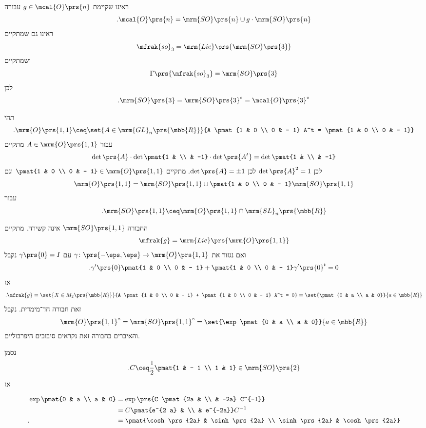 \documentclass[10pt, twoside]{book}
\begin{document}
\begin{example}
ראינו שקיימת
$g \in \mcal{O}\prs{n}$
עבורה
\[\text{.} \mcal{O}\prs{n} = \mrm{SO}\prs{n} \cup g \cdot \mrm{SO}\prs{n}\]
ראינו גם שמתקיים
\[\mfrak{so}_3 = \mrm{Lie}\prs{\mrm{SO}\prs{3}}\]
ושמתקיים
\[\Gamma\prs{\mfrak{so}_3} = \mrm{SO}\prs{3}\]
לכן
\[\text{.} \mrm{SO}\prs{3} = \mrm{SO}\prs{3}^\circ = \mcal{O}\prs{3}^\circ\]
\end{example}

\begin{example}
תהי
\[\text{.} \mrm{O}\prs{1,1} \ceq \set{A \in \mrm{GL}_n\prs{\mbb{R}}}{A \pmat{1 & 0 \\ 0 & - 1} A^t = \pmat{1 & 0 \\ 0 & - 1}}\]
עבור
$A \in \mrm{O}\prs{1,1}$
מתקיים
\[\det\prs{A} \cdot \det \pmat{1 & \\ & -1} \cdot \det\prs{A^t} = \det\pmat{1 & \\ & -1}\]
לכן
$\det\prs{A}^2 = 1$
לכן
$\det\prs{A} = \pm 1$.
מתקיים
$\pmat{1 & 0 \\ 0 & - 1} \in \mrm{O}\prs{1,1}$
וגם
\[\mrm{O}\prs{1,1} = \mrm{SO}\prs{1,1} \cup \pmat{1 & 0 \\ 0 & - 1} \mrm{SO}\prs{1,1}\]
עבור
\[\text{.} \mrm{SO}\prs{1,1} \ceq \mrm{O}\prs{1,1} \cap \mrm{SL}_n\prs{\mbb{R}}\]

החבורה
$\mrm{SO}\prs{1,1}$
אינה קשירה.
מתקיים
\[\mfrak{g} = \mrm{Lie}\prs{\mrm{O}\prs{1,1}}\]
ואם נגזור את
$\gamma \colon \prs{-\eps, \eps} \to \mrm{O}\prs{1,1}$
עם
$\gamma\prs{0} = I$
נקבל
\[\text{.}\gamma'\prs{0} \pmat{1 & 0 \\ 0 & - 1} + \pmat{1 & 0 \\ 0 & - 1} \gamma'\prs{0}^t = 0\]
אז
\begin{align*}
\text{.} \mfrak{g} = \set{X \in M_2\prs{\mbb{R}}}{A \pmat{1 & 0 \\ 0 & - 1} + \pmat{1 & 0 \\ 0 & - 1} A^t = 0} = \set{\pmat{0 & a \\ a & 0}}{a \in \mbb{R}}
\end{align*}
זאת חבורה חד־מימדית.
נקבל
\[\mrm{O}\prs{1,1}^\circ = \mrm{SO}\prs{1,1}^\circ = \set{\exp\pmat{0 & a \\ a & 0}}{a \in \mbb{R}}\]
והאיברים בחבורה זאת נקראים סיבובים היפרבוליים.

נסמן
\[\text{.} C \ceq \frac{1}{2} \pmat{1 & - 1 \\ 1 & 1} \in \mrm{SO}\prs{2}\]
אז
\begin{otherlanguage}{english}
\begin{align*}
\exp\pmat{0 & a \\ a & 0} &=
\exp\prs{C \pmat{2a & \\ & -2a} C^{-1}}
\\&=
C \pmat{e^{2 a} & \\ & e^{-2a}} C^{-1}
\\ \text{.} \hphantom{\exp\pmat{0 & a \\ a & 0}} &=
\pmat{\cosh\prs{2a} & \sinh\prs{2a} \\ \sinh\prs{2a} & \cosh\prs{2a}}
\end{align*}
\end{otherlanguage}


\end{example}
\end{document}
